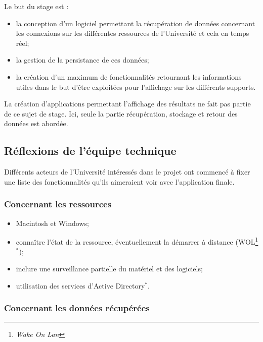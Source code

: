 \noindent Le but du stage est : 

\begin{itemize}
	\item la conception d'un logiciel permettant la r\'ecup\'eration de donn\'ees concernant les connexions sur les diff\'erentes ressources de l'Universit\'e et cela en temps r\'eel;
	\item la gestion de la persistance de ces donn\'ees;
	\item la cr\'eation d'un maximum de fonctionnalit\'es retournant les informations utiles dans le but d'\^etre exploit\'ees pour l'affichage sur les diff\'erents supports.

\end{itemize} 

\vspace{0.20cm}

La cr\'eation d'applications permettant l'affichage des r\'esultats ne fait pas partie de ce sujet de stage. 
Ici, seule la partie r\'ecup\'eration, stockage et retour des donn\'ees est abord\'ee.

\subsection{R\'eflexions de l'\'equipe technique}

Diff\'erents acteurs de l'Universit\'e int\'eress\'es dans le projet \YuukouII{} ont commenc\'e \`a fixer une liste des fonctionnalit\'es qu'ils aimeraient voir avec l'application finale.

\subsubsection{Concernant les ressources}

\begin{itemize}
	\item Macintosh et Windows;
	\item conna\^itre l'\'etat de la ressource, \'eventuellement la d\'emarrer \`a distance (WOL\protect\footnote{\textit{Wake On Lan}}$^*$);
	\item inclure une surveillance partielle du mat\'eriel et des logiciels;
	\item utilisation des services d'Active Directory$^*$.

\end{itemize}

\subsubsection{Concernant les donn\'ees r\'ecup\'er\'ees}

